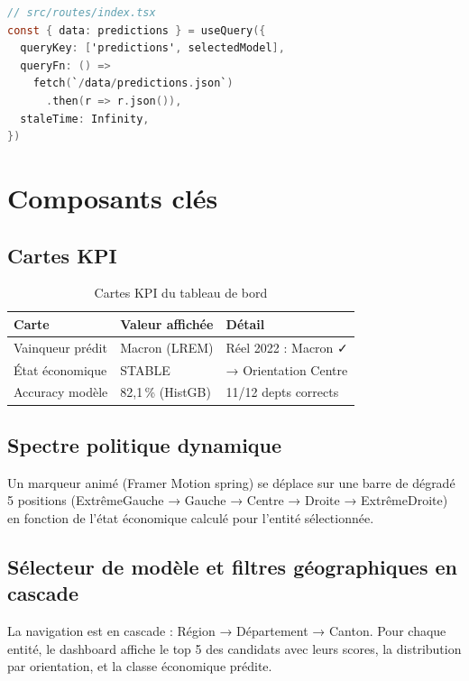 \documentclass[12pt,a4paper,oneside]{report}
\newcommand{\pct}[1]{#1\,\%}
\begin{document}
\begin{lstlisting}[style=tsstyle, caption={Chargement des prédictions — TanStack Query}, language=C]
// src/routes/index.tsx
const { data: predictions } = useQuery({
  queryKey: ['predictions', selectedModel],
  queryFn: () =>
    fetch(`/data/predictions.json`)
      .then(r => r.json()),
  staleTime: Infinity,
})
\end{lstlisting}

\section{Composants clés}

\subsection{Cartes KPI}

\begin{table}[H]
  \centering
  \caption{Cartes KPI du tableau de bord}
  \label{tab:kpi}
  \begin{tabular}{lll}
    \toprule
    \textbf{Carte} & \textbf{Valeur affichée} & \textbf{Détail} \\
    \midrule
    Vainqueur prédit & Macron (LREM)    & Réel 2022 : Macron ✓ \\
    État économique  & STABLE           & → Orientation Centre \\
    Accuracy modèle  & \pct{82,1} (HistGB) & 11/12 depts corrects \\
    \bottomrule
  \end{tabular}
\end{table}

\subsection{Spectre politique dynamique}

Un marqueur animé (Framer Motion spring) se déplace sur une barre de dégradé 5 positions (ExtrêmeGauche → Gauche → Centre → Droite → ExtrêmeDroite) en fonction de l'état économique calculé pour l'entité sélectionnée.

\subsection{Sélecteur de modèle et filtres géographiques en cascade}

La navigation est en cascade : Région → Département → Canton. Pour chaque entité, le dashboard affiche le top 5 des candidats avec leurs scores, la distribution par orientation, et la classe économique prédite.
\end{document}
